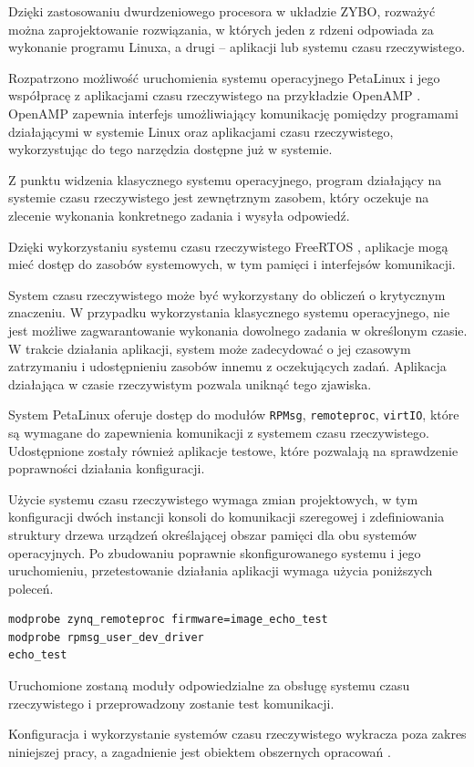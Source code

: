 Dzięki zastosowaniu dwurdzeniowego procesora w układzie ZYBO, rozważyć można zaprojektowanie rozwiązania, w których jeden z rdzeni odpowiada za wykonanie programu Linuxa, a drugi -- aplikacji lub systemu czasu rzeczywistego. %

Rozpatrzono możliwość uruchomienia systemu operacyjnego PetaLinux i jego współpracę z aplikacjami czasu rzeczywistego na przykładzie OpenAMP \cite{openamp-home}. 
OpenAMP zapewnia interfejs umożliwiający komunikację pomiędzy programami działającymi w systemie Linux oraz aplikacjami czasu rzeczywistego, wykorzystując do tego narzędzia dostępne już w systemie.

Z punktu widzenia klasycznego systemu operacyjnego, program działający na systemie czasu rzeczywistego jest zewnętrznym zasobem, który oczekuje na zlecenie wykonania konkretnego zadania i wysyła odpowiedź.

Dzięki wykorzystaniu systemu czasu rzeczywistego FreeRTOS \cite{freeRTOS-home}, aplikacje mogą mieć dostęp do zasobów systemowych, w tym pamięci i interfejsów komunikacji.


System czasu rzeczywistego może być wykorzystany do obliczeń o krytycznym znaczeniu. 
W przypadku wykorzystania klasycznego systemu operacyjnego, nie jest możliwe zagwarantowanie wykonania dowolnego zadania w określonym czasie. 
W trakcie działania aplikacji, system może zadecydować o jej czasowym zatrzymaniu i udostępnieniu zasobów innemu z oczekujących zadań. 
Aplikacja działająca w czasie rzeczywistym pozwala uniknąć tego zjawiska.

System PetaLinux oferuje dostęp do modułów \texttt{RPMsg}, \texttt{remoteproc}, \texttt{virtIO}, które są wymagane do zapewnienia komunikacji z systemem czasu rzeczywistego. 
Udostępnione zostały również aplikacje testowe, które pozwalają na sprawdzenie poprawności działania konfiguracji.

Użycie systemu czasu rzeczywistego wymaga zmian projektowych, w tym konfiguracji dwóch instancji konsoli do komunikacji szeregowej i zdefiniowania struktury drzewa urządzeń określającej obszar pamięci dla obu systemów operacyjnych. 
Po zbudowaniu poprawnie skonfigurowanego systemu i jego uruchomieniu, przetestowanie działania aplikacji wymaga użycia poniższych poleceń.

\begin{lstlisting}[breaklines=true]
modprobe zynq_remoteproc firmware=image_echo_test
modprobe rpmsg_user_dev_driver
echo_test
\end{lstlisting}

Uruchomione zostaną moduły odpowiedzialne za obsługę systemu czasu rzeczywistego i przeprowadzony zostanie test komunikacji. %

Konfiguracja i wykorzystanie systemów czasu rzeczywistego wykracza poza zakres niniejszej pracy, a zagadnienie jest obiektem obszernych opracowań \cite{adam-taylor-openamp,zynq-openamp-gsg}.

